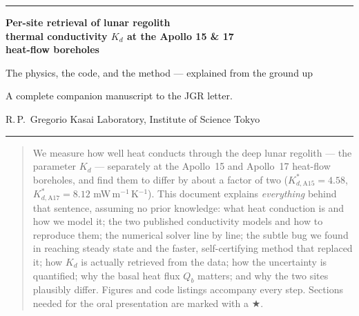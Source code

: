 \documentclass[11pt]{report}
\begin{document}
\thispagestyle{empty}
\begingroup\color{forest}\hrule height 2.5pt\endgroup
\vspace{14pt}
{\sffamily\bfseries\color{forest}\LARGE Per-site retrieval of lunar regolith\\[3pt]
thermal conductivity $K_d$ at the Apollo 15 \& 17\\[3pt]
heat-flow boreholes\par}
\vspace{10pt}
{\sffamily\Large\color{char} The physics, the code, and the method --- explained from the ground up\par}
\vspace{12pt}
{\color{dim}\large A complete companion manuscript to the JGR letter.\par}
\vspace{6pt}
{\color{char} R.\,P.\ Gregorio \quad\textbullet\quad Kasai Laboratory, Institute of Science Tokyo}
\vspace{8pt}
\begingroup\color{rulec}\hrule height 1pt\endgroup
\vspace{16pt}

\begin{abstract}
\noindent
We measure how well heat conducts through the deep lunar regolith --- the
parameter $K_d$ --- separately at the Apollo~15 and Apollo~17 heat-flow
boreholes, and find them to differ by about a factor of two
($K_{d,\mathrm{A15}}^{*}=4.58$, $K_{d,\mathrm{A17}}^{*}=8.12$
mW\,m$^{-1}$\,K$^{-1}$). This document explains \emph{everything} behind that
sentence, assuming no prior knowledge: what heat conduction is and how we model
it; the two published conductivity models and how to reproduce them; the
numerical solver line by line; the subtle bug we found in reaching steady state
and the faster, self-certifying method that replaced it; how $K_d$ is actually
retrieved from the data; how the uncertainty is quantified; why the basal heat
flux $Q_b$ matters; and why the two sites plausibly differ. Figures and code
listings accompany every step. Sections needed for the oral presentation are
marked with a $\bigstar$.
\end{abstract}
\end{document}

